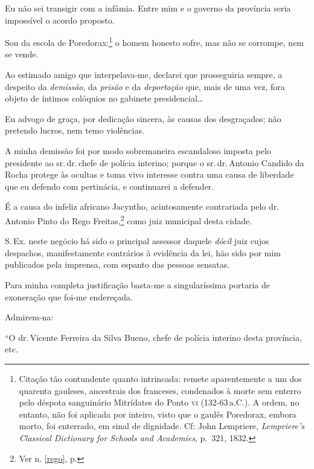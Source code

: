 Eu não sei transigir com a infâmia. Entre mim e o governo da província
seria impossível o acordo proposto.

Sou da escola de Poredorax:\footnote{Citação tão contundente quanto
  intrincada: remete aparentemente a um dos quarenta gauleses,
  ancestrais dos franceses, condenados à morte sem enterro pelo déspota
  sanguinário Mitrídates do Ponto \textsc{vi} (132-63\,a.C.). A ordem, no
  entanto, não foi aplicada por inteiro, visto que o gaulês Poredorax,
  embora morto, foi enterrado, em sinal de dignidade. Cf: John
  Lempriere, \emph{Lempriere's Classical Dictionary for Schools and
  Academies}, p.~321, 1832.} o homem honesto sofre, mas não se
corrompe, nem se vende.

Ao estimado amigo que interpelava-me, declarei que prosseguiria sempre,
a despeito da \emph{demissão}, da \emph{prisão} e da \emph{deportação}
que, mais de uma vez, fora objeto de íntimos colóquios no gabinete
presidencial\ldots{}

Eu advogo de graça, por dedicação sincera, às causas dos desgraçados;
não pretendo lucros, nem temo violências.

A minha demissão foi por modo sobremaneira escandaloso imposta pelo
presidente ao sr.\,dr.\,chefe de polícia interino; porque o sr.\,dr.\,Antonio Candido da Rocha protege às ocultas e toma vivo interesse contra
uma causa de liberdade que eu defendo com pertinácia, e continuarei a
defender.

É a causa do infeliz africano Jacyntho, acintosamente contrariada pelo
dr.\,Antonio Pinto do Rego Freitas,\footnote{Ver n. \ref{rego}, p. \pageref{rego}} 
como juiz municipal desta cidade.

S.\,Ex. neste negócio há sido o principal assessor daquele \emph{dócil}
juiz cujos despachos, manifestamente contrários à evidência da lei, hão
sido por mim publicados pela imprensa, com espanto das pessoas sensatas.

Para minha completa justificação basta-me a singularíssima portaria de
exoneração que foi-me endereçada.

Admirem-na:

``O dr.\,Vicente Ferreira da Silva Bueno, chefe de polícia interino desta
província, etc.

